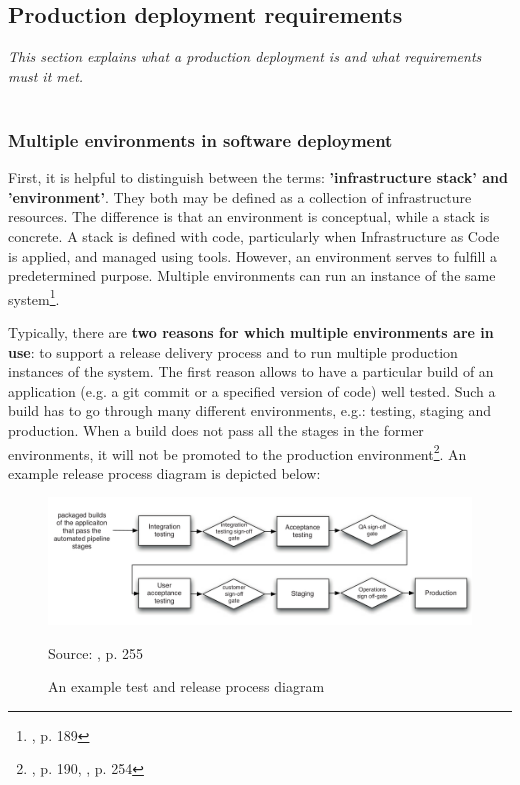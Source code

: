 \subsection{Production deployment requirements}
\textit{This section explains what a production deployment is and what requirements must it met.}
~\\
~\\

\subsubsection{Multiple environments in software deployment}
First, it is helpful to distinguish between the terms: \textbf{'infrastructure stack' and 'environment'}. They both may be defined as a collection of infrastructure resources. The difference is that an environment is conceptual, while a stack is concrete. A stack is defined with code, particularly when Infrastructure as Code is applied, and managed using tools. However, an environment serves to fulfill a predetermined purpose. Multiple environments can run an instance of the same system\footnote{\cite{book-iac}, p. 189}.

Typically, there are \textbf{two reasons for which multiple environments are in use}: to support a release delivery process and to run multiple production instances of the system. The first reason allows to have a particular build of an application (e.g. a git commit or a specified version of code) well tested. Such a build has to go through many different environments, e.g.: testing, staging and production. When a build does not pass all the stages in the former environments, it will not be promoted to the production environment\footnote{\cite{book-iac}, p. 190, \cite{book-cicd}, p. 254}. An example release process diagram is depicted below:
\begin{figure}[H]
    \centering
    \includegraphics[width=16cm]{figures/cicd-example-release-diagram.png}
    \label{fig:cicd-example-release-diagram}
    \caption{An example test and release process diagram}
    \small{Source: \cite{book-cicd}, p. 255}
\end{figure}

